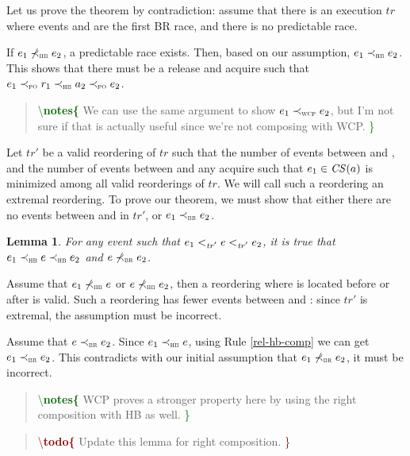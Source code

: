 \documentclass[letter,10pt]{article}
\newtheorem{lem}{Lemma}
\newcommand{\CS}[1]{\ensuremath{\mathit{CS(}#1)}\xspace}
\newcommand{\tr}{\ensuremath{\mathit{tr}}\xspace}
\newcommand{\trPrime}{\ensuremath{\mathit{tr'}}\xspace}
\newcommand{\PO}{PO\xspace}
\newcommand{\HB}{HB\xspace}
\newcommand{\WCP}{WCP\xspace}
\newcommand{\BR}{BR\xspace}
\newcommand{\ltTRPrime}{\ensuremath{<_\textsc{\trPrime}}\xspace}
\newcommand{\ltPO}{\ensuremath{\prec_\textsc{\tiny{\PO}}}\xspace}
\newcommand{\ltHB}{\ensuremath{\prec_\textsc{\tiny{\HB}}}\xspace}
\newcommand{\nltHB}{\ensuremath{\not\prec_\textsc{\tiny{\HB}}}\xspace}
\newcommand{\ltWCP}{\ensuremath{\prec_\textsc{\tiny{\WCP}}}\xspace}
\newcommand{\ltBR}{\ensuremath{\prec_\textsc{\tiny{\BR}}}\xspace}
\newcommand{\nltBR}{\ensuremath{\not\prec_\textsc{\tiny{\BR}}}\xspace}
\newcommand{\Ordered}[3]{\ensuremath{#1 #2 #3}}
\newcommand{\OrderedThree}[4]{\Ordered{#2}{#1}{\Ordered{#3}{#1}{#4}}}
\newcommand{\POOrdered}[2]{\Ordered{#1}{\ltPO}{#2}}
\newcommand{\nHBOrdered}[2]{\Ordered{#1}{\nltHB}{#2}}
\newcommand{\HBOrdered}[2]{\Ordered{#1}{\ltHB}{#2}}
\newcommand{\WCPOrdered}[2]{\Ordered{#1}{\ltWCP}{#2}}
\newcommand{\BROrdered}[2]{\Ordered{#1}{\ltBR}{#2}}
\newcommand{\nBROrdered}[2]{\Ordered{#1}{\nltBR}{#2}}
\newcommand\notes[1]{\begin{quote}\textcolor{darkgreen}{\textbackslash \textbf{notes\{}} #1 \textcolor{darkgreen}{\}}\end{quote}}
\newcommand\todo[1]{\begin{quote}\textcolor{darkred}{\textbackslash \textbf{todo\{}} #1 \textcolor{darkred}{\}}\end{quote}}
\begin{document}
Let us prove the theorem by contradiction: assume that there is an execution \tr
where events  and  are the first \BR race, and there
is no predictable race.

If \nHBOrdered{\event{e}{_1}}{\event{e}{_2}}, a predictable race
exists. Then, based on our assumption, \HBOrdered{\event{e}{_1}}{\event{e}{_2}}.
This shows that there must be a release  and acquire  such that
\POOrdered{\event{e}{_1}}{\HBOrdered{\event{r}{_1}}{\POOrdered{\event{a}{_2}}{\event{e}{_2}}}}.

\notes{We can use the same argument to show
  \WCPOrdered{\event{e}{_1}}{\event{e}{_2}}, but I'm not sure if that is
  actually useful since we're not composing with \WCP.}

Let \trPrime be a valid reordering of \tr such that the number of events between
 and , and the number of events between 
and any acquire  such that $\event{e}{_1} \in \CS{\event{a}}$ is
minimized among all valid reorderings of \tr. We will call such a reordering an
extremal reordering. To prove our theorem, we must show
that either there are no events between  and  in
\trPrime, or \BROrdered{\event{e}{_1}}{\event{e}{_2}}.

\begin{lem}
  For any event  such that
  \OrderedThree{\ltTRPrime}{\event{e}{_1}}{\event{e}{}}{\event{e}{_2}}, it is true
  that \OrderedThree{\ltHB}{\event{e}{_1}}{\event{e}{}}{\event{e}{_2}} and
  \nBROrdered{\event{e}{}}{\event{e}{_2}}.
  \label{lem:hb-between-e1-e2}
\end{lem}

Assume that \nHBOrdered{\event{e}{_1}}{\event{e}} or
\nHBOrdered{\event{e}}{\event{e}{_2}}, then a reordering where  is
located before  or after  is valid. Such a reordering
has fewer events between  and : since \trPrime is
extremal, the assumption must be incorrect.

Assume that \BROrdered{\event{e}}{\event{e}{_2}}. Since
\HBOrdered{\event{e}{_1}}{\event{e}}, using Rule \ref{rel-hb-comp} we can get
\BROrdered{\event{e}{_1}}{\event{e}{_2}}. This contradicts with our initial
assumption that \nBROrdered{\event{e}{_1}}{\event{e}{_2}}, it must be incorrect.

\notes{\WCP proves a stronger property here by using the right composition with
  HB as well.}
\todo{Update this lemma for right composition.}
\end{document}
